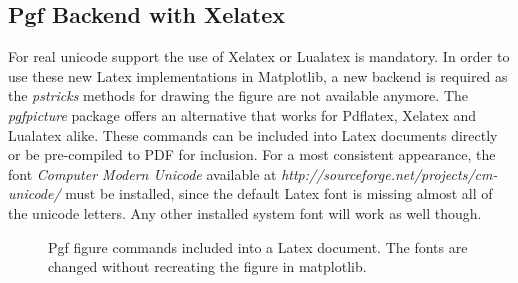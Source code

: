 \documentclass[12pt, a4paper]{article}
\begin{document}
\newpage
\subsection*{Pgf Backend with Xelatex}

For real unicode support the use of Xelatex or Lualatex is mandatory. In order to use these new Latex implementations in Matplotlib, a new backend is required as the \textit{pstricks} methods for drawing the figure are not available anymore. The \textit{pgfpicture} package offers an alternative that works for Pdflatex, Xelatex and Lualatex alike. These commands can be included into Latex documents directly or be pre-compiled to PDF for inclusion. For a most consistent appearance, the font \textit{Computer Modern Unicode} available at \textit{http://sourceforge.net/projects/cm-unicode/} must be installed, since the default Latex font is missing almost all of the unicode letters. Any other installed system font will work as well though.

\begin{figure}[h]
\hspace{1mm}
\caption{Pgf figure commands included into a Latex document. The fonts are changed without recreating the figure in matplotlib.}
\end{figure}
\end{document}

